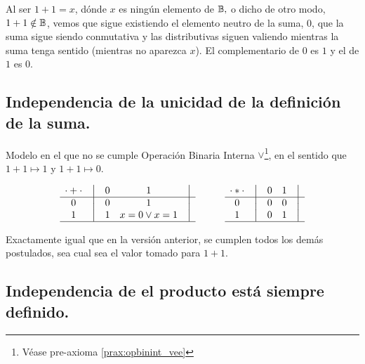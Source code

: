	Al ser \(1 + 1 = x\), dónde \(x\) es ningún elemento de $\mathbb{B},$ o dicho
de otro modo, \(1 + 1 \notin \mathbb{B}\), vemos que sigue existiendo el elemento
neutro de la suma, \(0\), que la suma sigue siendo conmutativa y las
distributivas siguen valiendo mientras la suma tenga sentido (mientras no
aparezca \(x\)). El complementario de \(0\) es \(1\) y el de \(1\) es \(0\).



\subsection{Independencia de la unicidad de la definición de la suma.}

Modelo en el que no se cumple Operación Binaria Interna $\vee$\footnote{Véase pre-axioma \ref{prax:opbinint_vee}}, en el sentido que \(1 + 1
\mapsto 1\) y \(1 + 1 \mapsto 0\).


\[
    \begin{matrix}
        {\cdot + \cdot} & \big{\vert} & {0} & {1} & \big{\vert} \\
        \hline
        {0}             & \big{\vert} & {0} & {1} & \big{\vert} \\
        {1}             & \big{\vert} & {1} & {x=0 \vee x=1} & \big{\vert} \\
        \hline
    \end{matrix}
    \qquad\qquad
    \begin{matrix}
        {\cdot * \cdot} & \big{\vert} & {0} & {1} & \big{\vert} \\
        \hline
        {0}                   & \big{\vert} & {0} & {0} & \big{\vert} \\
        {1}                   & \big{\vert} & {0} & {1} & \big{\vert} \\
        \hline
    \end{matrix}
\]



Exactamente igual que en la versión anterior, se cumplen todos los demás
postulados, sea cual sea el valor tomado para \(1 + 1\).



\subsection{Independencia de el producto está siempre definido.}



